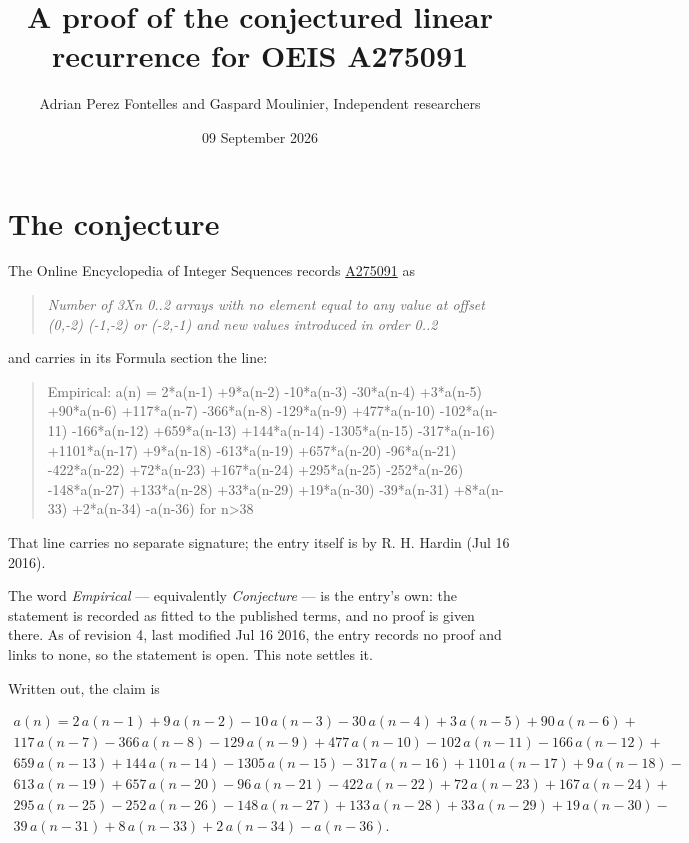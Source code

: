 \documentclass[11pt]{article}
\title{A proof of the conjectured linear recurrence for OEIS A275091}
\author{Adrian Perez Fontelles and Gaspard Moulinier, Independent researchers}
\date{09 September 2026}
\theoremstyle{definition}
\begin{document}
\maketitle
\section{The conjecture}

The Online Encyclopedia of Integer Sequences records \href{https://oeis.org/A275091}{A275091} as

\begin{quote}\itshape Number of 3Xn 0..2 arrays with no element equal to any value at offset (0,-2) (-1,-2) or (-2,-1) and new values introduced in order 0..2\end{quote}

and carries in its Formula section the line:

\begin{quote}\ttfamily Empirical: a(n) = 2*a(n-1) +9*a(n-2) -10*a(n-3) -30*a(n-4) +3*a(n-5) +90*a(n-6) +117*a(n-7) -366*a(n-8) -129*a(n-9) +477*a(n-10) -102*a(n-11) -166*a(n-12) +659*a(n-13) +144*a(n-14) -1305*a(n-15) -317*a(n-16) +1101*a(n-17) +9*a(n-18) -613*a(n-19) +657*a(n-20) -96*a(n-21) -422*a(n-22) +72*a(n-23) +167*a(n-24) +295*a(n-25) -252*a(n-26) -148*a(n-27) +133*a(n-28) +33*a(n-29) +19*a(n-30) -39*a(n-31) +8*a(n-33) +2*a(n-34) -a(n-36) for n>38\end{quote}

That line carries no separate signature; the entry itself is by R. H. Hardin (Jul 16 2016).

The word {\itshape Empirical} --- equivalently {\itshape Conjecture} --- is the entry's own: the statement is recorded as fitted to the published terms, and no proof is given there. As of revision 4, last modified Jul 16 2016, the entry records no proof and links to none, so the statement is open. This note settles it.

Written out, the claim is

\begin{multline*} a(n) = 2\,a(n-1) + 9\,a(n-2) - 10\,a(n-3) - 30\,a(n-4) + 3\,a(n-5) + 90\,a(n-6) + \\ 117\,a(n-7) - 366\,a(n-8) - 129\,a(n-9) + 477\,a(n-10) - 102\,a(n-11) - 166\,a(n-12) + \\ 659\,a(n-13) + 144\,a(n-14) - 1305\,a(n-15) - 317\,a(n-16) + 1101\,a(n-17) + 9\,a(n-18) - \\ 613\,a(n-19) + 657\,a(n-20) - 96\,a(n-21) - 422\,a(n-22) + 72\,a(n-23) + 167\,a(n-24) + \\ 295\,a(n-25) - 252\,a(n-26) - 148\,a(n-27) + 133\,a(n-28) + 33\,a(n-29) + 19\,a(n-30) - \\ 39\,a(n-31) + 8\,a(n-33) + 2\,a(n-34) - a(n-36). \end{multline*}
\end{document}
